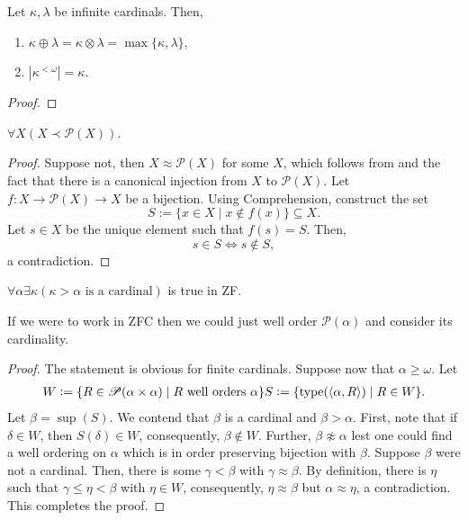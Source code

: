 \begin{corollary}
    Let $\kappa,\lambda$ be infinite cardinals. Then, 
    \begin{enumerate}[label=(\alph*)]
        \item $\kappa\oplus\lambda = \kappa\otimes\lambda = \max\{\kappa,\lambda\}$,
        \item $|\kappa^{<\omega}| = \kappa$.
    \end{enumerate}
\end{corollary}
\begin{proof}
    
\end{proof}

\begin{theorem}[Cantor]
    $\forall X\left(X\prec\mathscr P(X)\right)$.
\end{theorem}
\begin{proof}
    Suppose not, then $X\approx\mathscr P(X)$ for some $X$, which follows from  and the fact that there is a canonical injection from $X$ to $\mathscr P(X)$. Let $f:X\to\mathscr P(X)\to X$ be a bijection. Using Comprehension, construct the set 
    \begin{equation*}
        S := \{x\in X\mid x\notin f(x)\}\subseteq X.
    \end{equation*}
    Let $s\in X$ be the unique element such that $f(s) = S$. Then, 
    \begin{equation*}
        s\in S\iff s\notin S,
    \end{equation*}
    a contradiction.
\end{proof}

\begin{theorem}
    $\forall\alpha\exists\kappa\left(\kappa > \alpha\text{ is a cardinal}\right)$ is true in \textsf{ZF}.
\end{theorem}
If we were to work in \textsf{ZFC} then we could just well order $\mathscr P(\alpha)$ and consider its cardinality.
\begin{proof}
    The statement is obvious for finite cardinals. Suppose now that $\alpha\ge\omega$. Let 
    \begin{align*}
        W := \{R\in\mathscr P(\alpha\times\alpha)\mid R \text{ well orders }\alpha\}
        S := \{\operatorname{type}(\langle\alpha, R\rangle)\mid R\in W\}.
    \end{align*}
    Let $\beta = \sup(S)$. We contend that $\beta$ is a cardinal and $\beta > \alpha$. First, note that if $\delta\in W$, then $S(\delta)\in W$, consequently, $\beta\notin W$. Further, $\beta\not\approx\alpha$ lest one could find a well ordering on $\alpha$ which is in order preserving bijection with $\beta$. Suppose $\beta$ were not a cardinal. Then, there is some $\gamma < \beta$ with $\gamma\approx\beta$. By definition, there is $\eta$ such that $\gamma\le\eta < \beta$ with $\eta\in W$, consequently, $\eta\approx\beta$ but $\alpha\approx\eta$, a contradiction. This completes the proof.
\end{proof}


